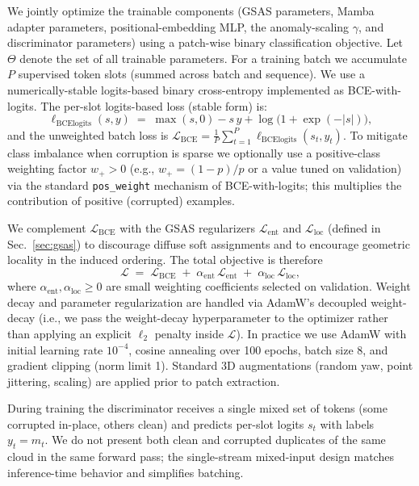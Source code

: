 We jointly optimize the trainable components (GSAS parameters, Mamba adapter parameters, positional-embedding MLP, the anomaly-scaling \(\gamma\), and discriminator parameters) using a patch-wise binary classification objective. Let \(\Theta\) denote the set of all trainable parameters. For a training batch we accumulate \(P\) supervised token slots (summed across batch and sequence). We use a numerically-stable logits-based binary cross-entropy implemented as BCE-with-logits. The per-slot logits-based loss (stable form) is:
\begin{equation}
\ell_{\mathrm{BCElogits}}(s,y) \;=\; \max(s,0) - s\,y + \log\big(1+\exp(-|s|)\big),
\end{equation}
and the unweighted batch loss is \(\mathcal{L}_{\mathrm{BCE}}=\frac{1}{P}\sum_{t=1}^P \ell_{\mathrm{BCElogits}}(s_t,y_t)\). To mitigate class imbalance when corruption is sparse we optionally use a positive-class weighting factor \(w_+>0\) (e.g., \(w_+=(1-p)/p\) or a value tuned on validation) via the standard \texttt{pos\_weight} mechanism of BCE-with-logits; this multiplies the contribution of positive (corrupted) examples.

We complement \(\mathcal{L}_{\mathrm{BCE}}\) with the GSAS regularizers \(\mathcal{L}_{\mathrm{ent}}\) and \(\mathcal{L}_{\mathrm{loc}}\) (defined in Sec.~\ref{sec:gsas}) to discourage diffuse soft assignments and to encourage geometric locality in the induced ordering. The total objective is therefore
\begin{equation}
\mathcal{L} \;=\; \mathcal{L}_{\mathrm{BCE}} \;+\; \alpha_{\mathrm{ent}}\,\mathcal{L}_{\mathrm{ent}} \;+\; \alpha_{\mathrm{loc}}\,\mathcal{L}_{\mathrm{loc}},
\end{equation}
where \(\alpha_{\mathrm{ent}},\alpha_{\mathrm{loc}}\ge 0\) are small weighting coefficients selected on validation. Weight decay and parameter regularization are handled via AdamW's decoupled weight-decay (i.e., we pass the weight-decay hyperparameter to the optimizer rather than applying an explicit \(\ell_2\) penalty inside \(\mathcal{L}\)). In practice we use AdamW with initial learning rate \(10^{-4}\), cosine annealing over 100 epochs, batch size 8, and gradient clipping (norm limit 1). Standard 3D augmentations (random yaw, point jittering, scaling) are applied prior to patch extraction.

During training the discriminator receives a single mixed set of tokens (some corrupted in-place, others clean) and predicts per-slot logits \(s_t\) with labels \(y_t=m_t\). We do not present both clean and corrupted duplicates of the same cloud in the same forward pass; the single-stream mixed-input design matches inference-time behavior and simplifies batching.

